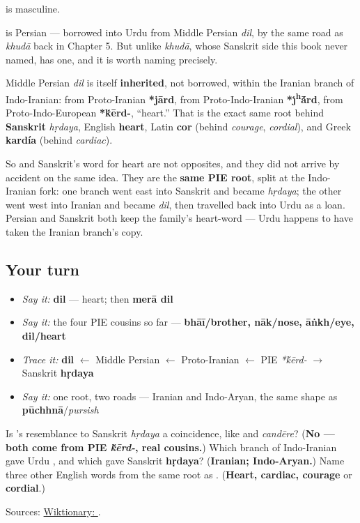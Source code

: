 \textbf{} is masculine.

\begin{cousinweb}
\textbf{} is Persian — borrowed into Urdu from Middle Persian \emph{dil}, by the same road as \emph{khudā} back in Chapter 5. But unlike \emph{khudā}, whose Sanskrit side this book never named, \textbf{} has one, and it is worth naming precisely.

Middle Persian \emph{dil} is itself \textbf{inherited}, not borrowed, within the Iranian branch of Indo-Iranian: from Proto-Iranian \textbf{*jārd}, from Proto-Indo-Iranian \textbf{*ȷ́\textsuperscript{h}\'{\={a}}rd}, from Proto-Indo-European \textbf{*\'{k}ērd-}, \textquotedblleft{}heart.\textquotedblright{} That is the exact same root behind \textbf{Sanskrit} \emph{hṛdaya}, English \textbf{heart}, Latin \textbf{cor} (behind \emph{courage}, \emph{cordial}), and Greek \textbf{kardía} (behind \emph{cardiac}).

So \textbf{} and Sanskrit's word for heart are not opposites, and they did not arrive by accident on the same idea. They are the \textbf{same PIE root}, split at the Indo-Iranian fork: one branch went east into Sanskrit and became \emph{hṛdaya}; the other went west into Iranian and became \emph{dil}, then travelled back into Urdu as a loan. Persian and Sanskrit both keep the family's heart-word — Urdu happens to have taken the Iranian branch's copy.
\end{cousinweb}

\subsection*{Your turn}
\begin{itemize}
\raggedright
  \item \emph{Say it:} \textbf{dil} — heart; then \textbf{merā dil}
  \item \emph{Say it:} the four PIE cousins so far — \textbf{bhāī/brother, nāk/nose, āṅkh/eye, dil/heart}
  \item \emph{Trace it:} \textbf{dil} $\leftarrow$ Middle Persian $\leftarrow$ Proto-Iranian $\leftarrow$ PIE \emph{*\'{k}ērd-} $\to$ Sanskrit \textbf{hṛdaya}
  \item \emph{Say it:} one root, two roads — Iranian and Indo-Aryan, the same shape as \textbf{pūchhnā}/\emph{pursish}
\end{itemize}

\begin{tcolorbox}[breakable,colback=teal!4,colframe=teal!35!black,title={Before you move on}]
Is \textbf{}'s resemblance to Sanskrit \emph{hṛdaya} a coincidence, like \textbf{} and \emph{candēre}? (\textbf{No — both come from PIE \emph{\'{k}ērd-}, real cousins.}) Which branch of Indo-Iranian gave Urdu \textbf{}, and which gave Sanskrit \textbf{hṛdaya}? (\textbf{Iranian; Indo-Aryan.}) Name three other English words from the same root as \textbf{}. (\textbf{Heart, cardiac, courage} or \textbf{cordial}.)

Sources: \href{https://en.wiktionary.org/wiki/\%D8\%AF\%D9\%84}{Wiktionary: }.
\end{tcolorbox}
